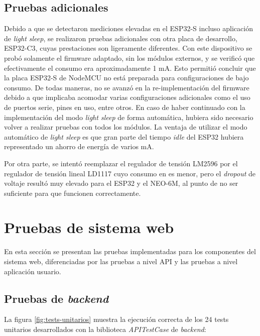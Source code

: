 \subsection{Pruebas adicionales}

Debido a que se detectaron mediciones elevadas en el ESP32-S incluso aplicación de \textit{light sleep}, se realizaron pruebas adicionales con otra placa de desarrollo, ESP32-C3, cuyas prestaciones son ligeramente diferentes\citep{ESP32C3:1}. Con este dispositivo se probó solamente el firmware adaptado, sin los módulos externos, y se verificó que efectivamente el consumo era aproximadamente 1 mA. Esto permitió concluir que la placa ESP32-S de NodeMCU no está preparada para configuraciones de bajo consumo. 
De todas maneras, no se avanzó en la re-implementación del firmware debido a que implicaba acomodar varias configuraciones adicionales como el uso de puertos serie, pines en uso, entre otros. En caso de haber continuado con la implementación del modo \textit{light sleep} de forma automática, hubiera sido necesario volver a realizar pruebas con todos los módulos. La ventaja de utilizar el modo automático de \textit{light sleep} es que gran parte del tiempo \textit{idle} del ESP32 hubiera representado un ahorro de energía de varios mA.

Por otra parte, se intentó reemplazar el regulador de tensión LM2596 por el regulador de tensión lineal LD1117 cuyo consumo en es menor\citep{LD1117:1}, pero el \textit{dropout} de voltaje resultó muy elevado para el ESP32 y el NEO-6M, al punto de no ser suficiente para que funcionen correctamente.

\section{Pruebas de sistema web}

En esta sección se presentan las pruebas implementadas para los componentes del sistema web, diferenciadas por las pruebas a nivel API y las pruebas a nivel aplicación usuario.

\subsection{Pruebas de \textit{backend}}

La figura \ref{fig:tests-unitarios} muestra la ejecución correcta de los 24 tests unitarios desarrollados con la biblioteca \textit{APITestCase} de \textit{backend}:

